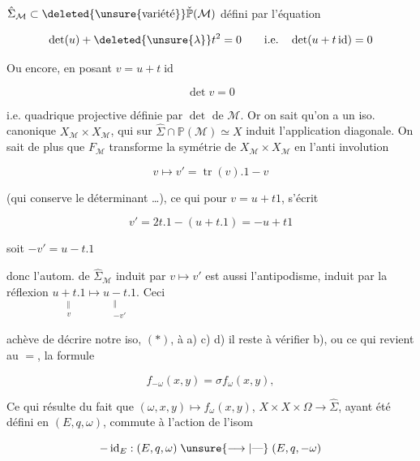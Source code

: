 $\hat\Sigma_{\mathcal M}\subset\deleted{\unsure{\text{variété}}}\check{\mathbb P}(\mathcal M)$ défini par l'équation 

\[
\det(u)+\deleted{\unsure{\lambda}}t^2=0\qquad\text{i.e.}\quad\det(u+t\operatorname{id})=0
\]

Ou encore, en posant $v=u+t\operatorname{id}$

\[
\det v=0
\]

i.e.  quadrique projective définie par $\det$ de $\mathcal M$. Or on sait qu'on a un iso. canonique  $X_{\mathcal M}\times X_{\mathcal M}$,  qui sur $\hat\Sigma\cap\mathbb P(\mathcal M)\simeq X$ induit l'application diagonale. On sait de plus que  $F_{\mathcal M}$ transforme la symétrie de $X_{\mathcal M}\times X_{\mathcal M}$ en  l'anti involution

\[
v\longmapsto v'=\operatorname{tr}(v).1-v
\]

(qui conserve le déterminant \ldots), ce qui pour $v=u+t1$,  s'écrit

\[
v'=2t.1-(u+t.1)=-u+t1
\]

soit $-v'=u-t.1$


donc l'autom. de $\hat\Sigma_{\mathcal M}$ induit par $v\mapsto v'$ est aussi l'antipodisme, induit par la réflexion $\underset{\substack{\Vert\\v}}{u+t.1}\longmapsto\underset{\substack{\Vert\\-v'}}{u-t.1}$. Ceci


achève de décrire notre iso, $(*)$,  à a) c) d) il reste à vérifier b), ou ce qui revient au $=$, la formule

\[
f_{-\omega}(x,y)=\sigma f_\omega(x,y),
\]

Ce qui résulte du fait que $(\omega,x,y)\mapsto f_\omega(x,y)$, $X\times X\times\Omega\longrightarrow\hat\Sigma$, ayant été défini  en $(E,q,\omega)$, commute à l'action de l'isom

\[
-\operatorname{id}_E:(E,q,\omega)\mathrel{\unsure{\longrightarrow|\text{---}}}(E,q,-\omega)
\]

